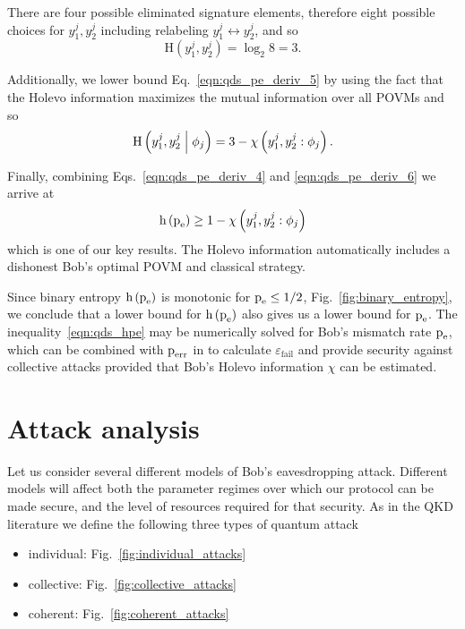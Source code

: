 \noindent There are four possible eliminated signature elements, therefore eight possible choices for $y_1^j, y_2^j$ including relabeling $y_1^j \leftrightarrow y_2^j$, and so 
\begin{equation}
\text{H}\left(y_1^j, y_2^j\right) = \log_2 8 = 3.
\end{equation}

\noindent Additionally, we lower bound Eq.~\ref{eqn:qds_pe_deriv_5} by using the fact that the Holevo information maximizes the mutual information over all POVMs 
and so
\begin{equation}\label{eqn:qds_pe_deriv_6}
\text{H}\left(y_1^j, y_2^j \; \middle| \; \phi_j \right) = 3 - \chi\left(y_1^j, y_2^j : \phi_j\right).
\end{equation}

\noindent Finally, combining Eqs.~\ref{eqn:qds_pe_deriv_4} and \ref{eqn:qds_pe_deriv_6} we arrive at
\begin{equation}\label{eqn:qds_hpe}
\text{h}\left(\text{p}_{\text{e}}\right) \ge 1 - \chi \left(y_1^j, y_2^j : \phi_j\right)
\end{equation}
which is one of our key results. The Holevo information automatically includes a dishonest Bob's optimal POVM and classical strategy.

Since binary entropy $\text{h}\left(\text{p}_{\text{e}}\right)$ is monotonic for $\text{p}_{\text{e}} \le 1/2$, Fig.~\ref{fig:binary_entropy}, we conclude that a lower bound for $\text{h}\left(\text{p}_{\text{e}}\right)$ also gives us a lower bound for $\text{p}_{\text{e}}$.  The inequality~\ref{eqn:qds_hpe} may be numerically solved for Bob's mismatch rate $\text{p}_{\text{e}}$, which can be combined with $\text{p}_{\text{err}}$ in to calculate $\varepsilon_{\text{fail}}$ and provide security against collective attacks  provided that Bob's Holevo information $\chi$ can be estimated.

\section{Attack analysis}\label{sec:attack_analysis}
Let us consider several different models of Bob's eavesdropping attack. Different models will affect both the parameter regimes over which our protocol can be made secure, and the level of resources required for that security. As in the QKD literature we define the following three types of quantum attack
\begin{itemize}
\item individual: Fig.~\ref{fig:individual_attacks}
\item collective: Fig.~\ref{fig:collective_attacks}
\item coherent: Fig.~\ref{fig:coherent_attacks}
\end{itemize}

